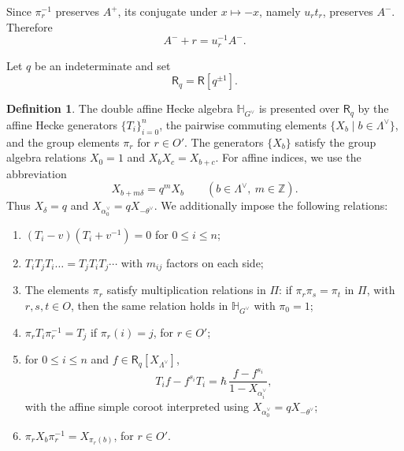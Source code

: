 \documentclass{amsart}
\newcommand{\Ring}{\mathsf{R}}
\theoremstyle{definition}
\newtheorem{defi}[Thm]{Definition}
\numberwithin{equation}{section}
\begin{document}
Since \(\pi_r^{-1}\) preserves \(A^+\), its conjugate under \(x\mapsto -x\),
namely \(u_rt_r\), preserves \(A^-\). Therefore
\begin{equation}\label{eq:negative-alcove-shift}
A^-+r=u_r^{-1}A^-.
\end{equation}

Let \(q\) be an indeterminate and set
\[
\Ring_q=\Ring[q^{\pm1}].
\]

\begin{defi}\label{def:daha}
    The double affine Hecke algebra $\mathbb{H}_{G^\vee}$ is presented over $\Ring_q$ by the affine Hecke generators $\{T_i\}_{i=0}^n$, the pairwise commuting elements $\{X_b \mid b \in \Lambda^\vee\}$, and the group elements $\pi_r$ for $r \in O'$. The generators $\{X_b\}$ satisfy the group algebra relations $X_0 = 1$ and $X_b X_c = X_{b+c}$.
    For affine indices, we use the abbreviation
    \[
    X_{b+m\delta}=q^mX_b
    \qquad (b\in\Lambda^\vee,\ m\in\mathbb Z).
    \]
    Thus \(X_\delta=q\) and
    \(X_{\alpha_0^\vee}=qX_{-\theta^\vee}\).
    We additionally impose the following relations:
    \begin{enumerate}
        \item\label{rel:daha-quadratic} $(T_i - v)(T_i + v^{-1}) = 0$ for $0 \leqslant i \leqslant n$;
        \item\label{rel:daha-braid} $T_iT_jT_i \dots = T_jT_iT_j \cdots$ with $m_{ij}$ factors on each side;
        \item\label{rel:daha-pi-product} The elements \(\pi_r\) satisfy multiplication relations in \(\Pi\): if \(\pi_r\pi_s=\pi_t\) in \(\Pi\), with \(r,s,t\in O\), then the same relation holds in \(\mathbb H_{G^\vee}\) with $\pi_0 = 1$;
        \item\label{rel:daha-diagram} $\pi_r T_i \pi_r^{-1} = T_j$ if $\pi_r(i)=j$, for $r \in O'$;
        \item\label{rel:daha-bernstein} for \(0\leqslant i\leqslant n\) and \(f\in \Ring_q[X_{\Lambda^\vee}]\),
        \[
        T_if-f^{s_i}T_i
        =
        \hbar\,\frac{f-f^{s_i}}{1-X_{\alpha_i^\vee}},
        \]
        with the affine simple coroot interpreted using \(X_{\alpha_0^\vee}=qX_{-\theta^\vee}\);
        \item\label{rel:daha-pi-x} $\pi_r X_b \pi_r^{-1} = X_{\pi_r(b)}$, for $r \in O'$.
    \end{enumerate}
\end{defi}
\end{document}
